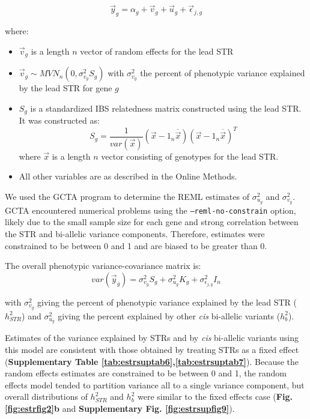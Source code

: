 \begin{equation}
\vec{y}_g = \alpha_g + \vec{v}_g + \vec{u}_g + \vec{\epsilon}_{j,g}
\end{equation}

where:
\begin{itemize}
\item $\vec{v}_g$ is a length $n$ vector of random effects for the lead STR
\item $\vec{v}_g \sim MVN_n(0, \sigma^2_{v_g}S_g)$ with $\sigma^2_{v_g}$ the percent of phenotypic variance explained by the lead STR for gene $g$
\item $S_g$ is a standardized IBS relatedness matrix constructed using the lead STR. It was constructed as:
\begin{equation}
S_g = \frac{1}{var(\vec{x})}(\vec{x}-1_n\overline{\vec{x}})(\vec{x}-1_n\overline{\vec{x}})^T
\end{equation}
where $\vec{x}$ is a length $n$ vector consisting of genotypes for the lead STR.
\item All other variables are as described in the Online Methods.
\end{itemize}

We used the GCTA program \cite{YangLeeGoddardEtAl2011} to determine the REML estimates of $\sigma^2_{u_g}$ and $\sigma^2_{v_g}$. GCTA encountered numerical problems using the \texttt{--reml-no-constrain} option, likely due to the small sample size for each gene and strong correlation between the STR and bi-allelic variance components. Therefore, estimates were constrained to be between 0 and 1 and are biased to be greater than 0.

The overall phenotypic variance-covariance matrix is:
\begin{equation}
var(\vec{y}_g) = \sigma^2_{v_g}S_g + \sigma^2_{u_g}K_g + \sigma^2_{\epsilon_{j,g}} I_n
\end{equation}

with $\sigma^2_{v_g}$ giving the percent of phenotypic variance explained by the lead STR ($h^2_{STR}$) and $\sigma^2_{u_g}$ giving the percent explained by other \emph{cis} bi-allelic variants ($h^2_{b}$).

Estimates of the variance explained by STRs and by \emph{cis} bi-allelic variants using this model are consistent with those obtained by treating STRs as a fixed effect (\textbf{Supplementary Table \ref{tab:estrsuptab6},\ref{tab:estrsuptab7}}). Because the random effects estimates are constrained to be between 0 and 1, the random effects model tended to partition variance all to a single variance component, but overall distributions of $h^2_{STR}$ and $h^2_{b}$ were similar to the fixed effects case (\textbf{Fig. \ref{fig:estrfig2}b} and \textbf{Supplementary Fig. \ref{fig:estrsupfig9}}).

